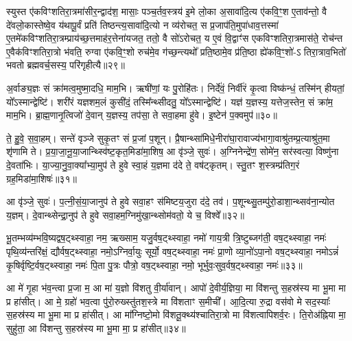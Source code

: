 स्युस्त ए॑कविꣳशतिरा॒त्रमा॑सीर॒न्द्वाद॑श॒ मासाः॒ पञ्च॒र्तव॒स्त्रय॑ इ॒मे लो॒का अ॒सावा॑दि॒त्य ए॑कवि॒ꣳ॒श ए॒ताव॑न्तो॒ वै दे॑वलो॒कास्तेष्वे॒व य॑थापू॒र्वं प्रति॑ तिष्ठन्त्य॒सावा॑दि॒त्यो न व्य॑रोचत॒ स प्र॒जाप॑ति॒मुपा॑धाव॒त्तस्मा॑ ए॒तमे॑कविꣳशति\-रा॒त्रम्प्राय॑च्छ॒त्तमाह॑र॒त्तेना॑यजत॒ ततो॒ वै सो॑\-ऽरोचत॒ य ए॒वं वि॒द्वाꣳ॑स एकविꣳशतिरा॒त्रमास॑ते॒ रोच॑न्त ए॒वैक॑विꣳशतिरा॒त्रो भ॑वति॒ रुग्वा ए॑कवि॒ꣳ॒शो रुच॑मे॒व ग॑च्छ॒न्त्यथो᳚ प्रति॒ष्ठामे॒व प्र॑ति॒ष्ठा ह्ये॑कवि॒ꣳ॒शो॑-\-ऽ तिरा॒त्राव॒भितो॑ भवतो ब्रह्मवर्च॒सस्य॒ परि॑गृहीत्यै॥२९॥

{\anuvakamend[{गृ॒ह्ण॒न्ति॒ दि॒वा॒की॒र्त्ये॑नै॒वोभ॒यतो॒ नाप्र॑तिष्ठिता॒ आस॑त॒ एक॑विꣳशतिश्च॥10॥}]}

अ॒र्वाङ्य॒ज्ञः सं क्रा॑मत्व॒मुष्मा॒दधि॒ माम॒भि। ऋषी॑णां॒ यः पु॒रोहि॑तः। निर्दे॑वं॒ निर्वी॑रं कृ॒त्वा विष्क॑न्धं॒ तस्मि॑न् हीयतां॒ यो᳚\-ऽस्मान्द्वेष्टि॑। शरी॑रं यज्ञशम॒लं कुसी॑दं॒ तस्मि᳚न्थ्सीदतु॒ यो᳚\-ऽस्मान्द्वेष्टि॑। यज्ञ॑ य॒ज्ञस्य॒ यत्तेज॒स्तेन॒ सं क्रा॑म॒ माम॒भि। ब्रा॒ह्म॒णानृ॒त्विजो॑ दे॒वान् य॒ज्ञस्य॒ तप॑सा॒ ते सवा॒हमा हु॑वे। इ॒ष्टेन॑ प॒क्वमुप॑॥३०॥

ते॒ हु॒वे॒ स॒वा॒हम्। सन्ते॑ वृञ्जे सुकृ॒तꣳ सं प्र॒जां प॒शून्। प्रै॒षान्थ्सा॑मिधे॒नीरा॑घा॒रावाज्य॑भागा॒वाश्रु॑तम्प्र॒त्याश्रु॑त॒मा शृ॑णामि ते। प्र॒या॒जा॒नू॒या॒जान्थ्स्वि॑ष्ट॒कृत॒मिडा॑मा॒शिष॒ आ वृ॑ञ्जे॒ सुवः॑। अ॒ग्निनेन्द्रे॑ण॒ सोमे॑न॒ सर॑स्वत्या॒ विष्णु॑ना दे॒वता॑भिः। या॒ज्या॒नु॒वा॒क्या᳚भ्या॒मुप॑ ते हुवे स्वा॒हं य॒ज्ञमा द॑दे ते॒ वष॑ट्कृतम्। स्तु॒तꣳ श॒स्त्रम्प्र॑तिग॒रं ग्रह॒मिडा॑मा॒शिषः॑॥३१॥

आ वृ॑ञ्जे॒ सुवः॑। प॒त्नी॒सं॒या॒जानुप॑ ते हुवे सवा॒हꣳ स॑मिष्टय॒जुरा द॑दे॒ तव॑। प॒शून्थ्सु॒तम्पु॑रो॒डाशा॒न्थ्सव॑ना॒न्योत य॒ज्ञम्। दे॒वान्थ्सेन्द्रा॒नुप॑ ते हुवे सवा॒हम॒ग्निमु॑खा॒न्थ्सोम॑वतो॒ ये च॒ विश्वे᳚॥३२॥

{\anuvakamend[{उप॒ ग्रह॒मिडा॑मा॒शिषो॒ द्वात्रिꣳ॑शच्च॥11॥}]}

भू॒तम्भव्य॑म्भवि॒ष्यद्वष॒ट्थ्स्वाहा॒ नम॒ ऋख्साम॒ यजु॒र्वष॒ट्थ्स्वाहा॒ नमो॑ गाय॒त्री त्रि॒ष्टुब्जग॑ती॒ वष॒ट्थ्स्वाहा॒ नमः॑ पृथि॒व्य॑न्तरि॑क्षं॒ द्यौर्वष॒ट्थ्स्वाहा॒ नमो॒\-ऽग्निर्वा॒युः सूर्यो॒ वष॒ट्थ्स्वाहा॒ नमः॑ प्रा॒णो व्या॒नो॑\-ऽपा॒नो वष॒ट्थ्स्वाहा॒ नमो\-ऽन्नं॑ कृ॒षिर्वृष्टि॒र्वष॒ट्थ्स्वाहा॒ नमः॑ पि॒ता पु॒त्रः पौत्रो॒ वष॒ट्थ्स्वाहा॒ नमो॒ भूर्भुवः॒सुव॒र्वष॒ट्थ्स्वाहा॒ नमः॑॥३३॥

{\anuvakamend[{भुव॑श्च॒त्वारि॑ च॥12॥}]}

आ मे॑ गृ॒हा भ॑व॒न्त्वा प्र॒जा म॒ आ मा॑ य॒ज्ञो वि॑शतु वी॒र्या॑वान्। आपो॑ दे॒वीर्य॒ज्ञिया॒ मा वि॑शन्तु स॒हस्र॑स्य मा भू॒मा मा प्र हा॑सीत्। आ मे॒ ग्रहो॑ भव॒त्वा पु॑रो॒रुख्स्तु॑तश॒स्त्रे मा वि॑शताꣳ स॒मीची᳚। आ॒दि॒त्या रु॒द्रा वस॑वो मे सद॒स्याः᳚ स॒हस्र॑स्य मा भू॒मा मा प्र हा॑सीत्। आ मा᳚ग्निष्टो॒मो वि॑शतू॒क्थ्य॑श्चातिरा॒त्रो मा वि॑शत्वापिशर्व॒रः। ति॒रोअ॑ह्निया मा॒ सुहु॑ता॒ आ वि॑शन्तु स॒हस्र॑स्य मा भू॒मा मा॒ प्र हा॑सीत्॥३४॥

